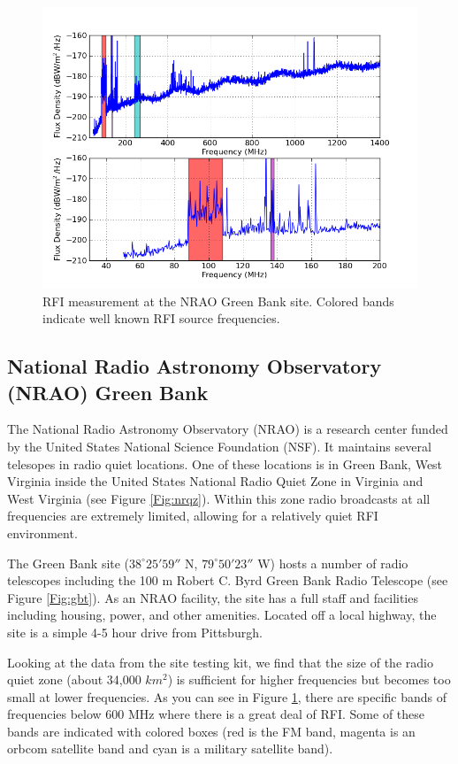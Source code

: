 \begin{figure}[htb]
\begin{center}
\includegraphics[width=0.9\linewidth]{RFI_testing/figures/GBT_bands.png}
\caption{RFI measurement at the NRAO Green Bank site. Colored bands indicate well known RFI source frequencies.}
\label{Fig:gbtrfi}
\end{center}
\end{figure}

\subsection{National Radio Astronomy Observatory (NRAO) Green Bank}

The National Radio Astronomy Observatory (NRAO) is a research center funded by the United States National Science Foundation (NSF). It maintains several telesopes in radio quiet locations. One of these locations is in Green Bank, West Virginia inside the United States National Radio Quiet Zone in Virginia and West Virginia (see Figure \ref{Fig:nrqz}). Within this zone radio broadcasts at all frequencies are extremely limited, allowing for a relatively quiet RFI environment. 

The Green Bank site ($38^\circ 25' 59''$ N, $79^\circ 50' 23''$ W) hosts a number of radio telescopes including the 100 m Robert C. Byrd Green Bank Radio Telescope (see Figure \ref{Fig:gbt}). As an NRAO facility, the site has a full staff and facilities including housing, power, and other amenities. Located off a local highway, the site is a simple 4-5 hour drive from Pittsburgh. 

Looking at the data from the site testing kit, we find that the size of the radio quiet zone (about 34,000 $km^2$) is sufficient for higher frequencies but becomes too small at lower frequencies. As you can see in Figure \ref{Fig:gbtrfi}, there are specific bands of frequencies below 600 MHz where there is a great deal of RFI. Some of these bands are indicated with colored boxes (red is the FM band, magenta is an orbcom satellite band and cyan is a military satellite band). 

